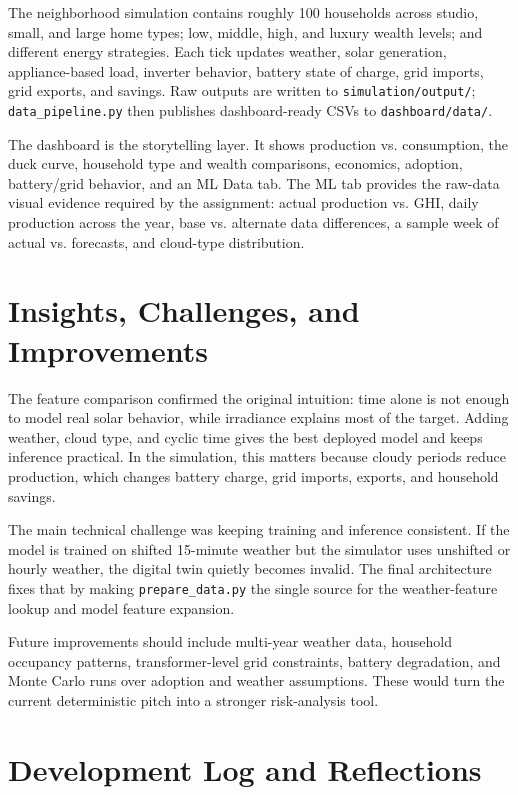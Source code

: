 \documentclass[paper=a4, fontsize=11pt]{scrartcl}
\begin{document}
The neighborhood simulation contains roughly 100 households across studio,
small, and large home types; low, middle, high, and luxury wealth levels; and
different energy strategies. Each tick updates weather, solar generation,
appliance-based load, inverter behavior, battery state of charge, grid imports,
grid exports, and savings. Raw outputs are written to
\texttt{simulation/output/}; \texttt{data\_pipeline.py} then publishes
dashboard-ready CSVs to \texttt{dashboard/data/}.

The dashboard is the storytelling layer. It shows production vs. consumption,
the duck curve, household type and wealth comparisons, economics, adoption,
battery/grid behavior, and an ML Data tab. The ML tab provides the raw-data
visual evidence required by the assignment: actual production vs. GHI, daily
production across the year, base vs. alternate data differences, a sample week
of actual vs. forecasts, and cloud-type distribution.

\section{Insights, Challenges, and Improvements}

The feature comparison confirmed the original intuition: time alone is not
enough to model real solar behavior, while irradiance explains most of the
target. Adding weather, cloud type, and cyclic time gives the best deployed
model and keeps inference practical. In the simulation, this matters because
cloudy periods reduce production, which changes battery charge, grid imports,
exports, and household savings.

The main technical challenge was keeping training and inference consistent.
If the model is trained on shifted 15-minute weather but the simulator uses
unshifted or hourly weather, the digital twin quietly becomes invalid. The
final architecture fixes that by making \texttt{prepare\_data.py} the single
source for the weather-feature lookup and model feature expansion.

Future improvements should include multi-year weather data, household
occupancy patterns, transformer-level grid constraints, battery degradation,
and Monte Carlo runs over adoption and weather assumptions. These would turn
the current deterministic pitch into a stronger risk-analysis tool.

\section{Development Log and Reflections}
\end{document}
